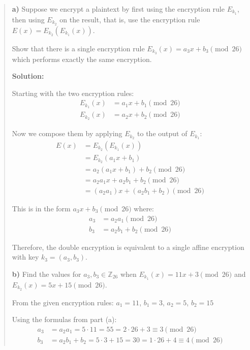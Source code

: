 \documentclass[12pt]{article}
\begin{document}
\begin{quote}
\textbf{a)} Suppose we encrypt a plaintext by first using the encryption rule $E_{k_1}$, then using $E_{k_2}$ on the result, that is, use the encryption rule $E(x) = E_{k_2}(E_{k_1}(x))$.

\vspace{0.3cm}

Show that there is a single encryption rule $E_{k_3}(x) = a_3x + b_3 \pmod{26}$ which performs exactly the same encryption.

\vspace{0.3cm}

\textbf{Solution:}

Starting with the two encryption rules:
\begin{align*}
E_{k_1}(x) &= a_1x + b_1 \pmod{26}\\
E_{k_2}(x) &= a_2x + b_2 \pmod{26}
\end{align*}

Now we compose them by applying $E_{k_2}$ to the output of $E_{k_1}$:
\begin{align*}
E(x) &= E_{k_2}(E_{k_1}(x))\\
&= E_{k_2}(a_1x + b_1)\\
&= a_2(a_1x + b_1) + b_2 \pmod{26}\\
&= a_2a_1x + a_2b_1 + b_2 \pmod{26}\\
&= (a_2a_1)x + (a_2b_1 + b_2) \pmod{26}
\end{align*}

This is in the form $a_3x + b_3 \pmod{26}$ where:
\begin{align*}
a_3 &= a_2a_1 \pmod{26}\\
b_3 &= a_2b_1 + b_2 \pmod{26}
\end{align*}

Therefore, the double encryption is equivalent to a single affine encryption with key $k_3 = (a_3, b_3)$.

\vspace{0.5cm}

\textbf{b)} Find the values for $a_3, b_3 \in \mathbb{Z}_{26}$ when $E_{k_1}(x) = 11x + 3 \pmod{26}$ and $E_{k_2}(x) = 5x + 15 \pmod{26}$.

\vspace{0.3cm}

From the given encryption rules: $a_1 = 11$, $b_1 = 3$, $a_2 = 5$, $b_2 = 15$

Using the formulas from part (a):
\begin{align*}
a_3 &= a_2a_1 = 5 \cdot 11 = 55 = 2 \cdot 26 + 3 \equiv 3 \pmod{26}\\
b_3 &= a_2b_1 + b_2 = 5 \cdot 3 + 15 = 30 = 1 \cdot 26 + 4 \equiv 4 \pmod{26}
\end{align*}


\end{quote}
\end{document}
